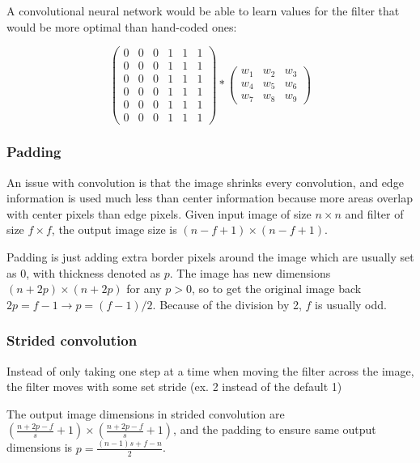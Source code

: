 \documentclass[12pt]{article}
\begin{document}
A convolutional neural network would be able to learn values for the filter that would be
more optimal than hand-coded ones:

\[
    \begin{pmatrix}
        0 & 0 & 0 & 1 & 1 & 1\\
        0 & 0 & 0 & 1 & 1 & 1\\
        0 & 0 & 0 & 1 & 1 & 1\\
        0 & 0 & 0 & 1 & 1 & 1\\
        0 & 0 & 0 & 1 & 1 & 1\\
        0 & 0 & 0 & 1 & 1 & 1
    \end{pmatrix}
    *
    \begin{pmatrix}
        w_1 & w_2 & w_3\\
        w_4 & w_5 & w_6\\
        w_7 & w_8 & w_9
    \end{pmatrix}
\]

\subsubsection{Padding}

An issue with convolution is that the image shrinks every convolution, and edge information
is used much less than center information because more areas overlap with center
pixels than edge pixels. Given input image of size $n \times n$ and filter of size $f
\times f$, the output image size is $(n-f+1) \times (n-f+1)$.

Padding is just adding extra border pixels around the image which are usually
set as 0, with thickness denoted as $p$. The image has new dimensions $(n + 2p) \times
(n + 2p)$ for any $p > 0$, so to get the original image back $2p = f - 1 \rightarrow p = (f-1)/2$.
Because of the division by 2, $f$ is usually odd.

\subsubsection{Strided convolution}

Instead of only taking one step at a time when moving the filter across the image, the filter
moves with some set stride (ex. 2 instead of the default 1)

The output image dimensions in strided convolution are
$(\frac{n+2p-f}{s}+1) \times (\frac{n+2p-f}{s}+1)$, and the padding to ensure
same output dimensions is $p = \frac{(n-1)s+f-n}{2}$.
\end{document}
